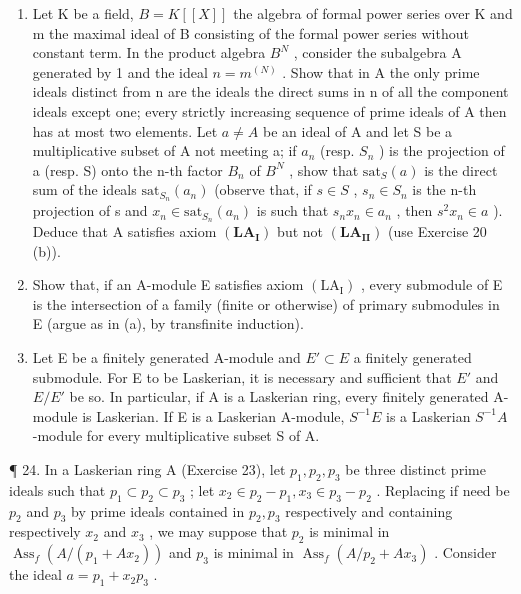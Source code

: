 \begin{enumerate}
\def\labelenumi{(\alph{enumi})}
\setcounter{enumi}{2}
\item
  Let K be a field, \(B = K[[X]]\) the algebra of formal power series over K and m the maximal ideal of B consisting of the formal power series without constant term. In the product algebra \(B^{N}\) , consider the subalgebra A generated by 1 and the ideal \(n = m^{(N)}\) . Show that in A the only prime ideals distinct from n are the ideals the direct sums in n of all the component ideals except one; every strictly increasing sequence of prime ideals of A then has at most two elements. Let \(a \neq A\) be an ideal of A and let S be a multiplicative subset of A not meeting a; if \(a_{n}\) (resp. \(S_{n}\) ) is the projection of a (resp. S) onto the n-th factor \(B_{n}\) of \(B^{N}\) , show that \(\text{sat}_{S}(a)\) is the direct sum of the ideals \(\text{sat}_{S_{n}}(a_{n})\) (observe that, if \(s \in S\) , \(s_{n} \in S_{n}\) is the n-th projection of s and \(x_{n} \in \text{sat}_{S_{n}}(a_{n})\) is such that \(s_{n}x_{n} \in a_{n}\) , then \(s^{2}x_{n} \in a\) ). Deduce that A satisfies axiom \((\mathbf{LA}_{\mathbf{I}})\) but not \((\mathbf{LA}_{\mathbf{II}})\) (use Exercise 20 (b)).
\item
  Show that, if an A-module E satisfies axiom \((\mathrm{LA}_{\mathrm{I}})\) , every submodule of E is the intersection of a family (finite or otherwise) of primary submodules in E (argue as in (a), by transfinite induction).
\item
  Let E be a finitely generated A-module and \(E' \subset E\) a finitely generated submodule. For E to be Laskerian, it is necessary and sufficient that \(E'\) and \(E/E'\) be so. In particular, if A is a Laskerian ring, every finitely generated A-module is Laskerian. If E is a Laskerian A-module, \(S^{-1}E\) is a Laskerian \(S^{-1}A\) -module for every multiplicative subset S of A.
\end{enumerate}

¶ 24. In a Laskerian ring A (Exercise 23), let \(p_1, p_2, p_3\) be three distinct prime ideals such that \(p_1 \subset p_2 \subset p_3\) ; let \(x_2 \in p_2 - p_1, x_3 \in p_3 - p_2\) . Replacing if need be \(p_2\) and \(p_3\) by prime ideals contained in \(p_2, p_3\) respectively and containing respectively \(x_2\) and \(x_3\) , we may suppose that \(p_2\) is minimal in \(\operatorname{Ass}_f(A / (p_1 + Ax_2))\) and \(p_3\) is minimal in \(\operatorname{Ass}_f(A / p_2 + Ax_3)\) . Consider the ideal \(a = p_1 + x_2p_3\) .

